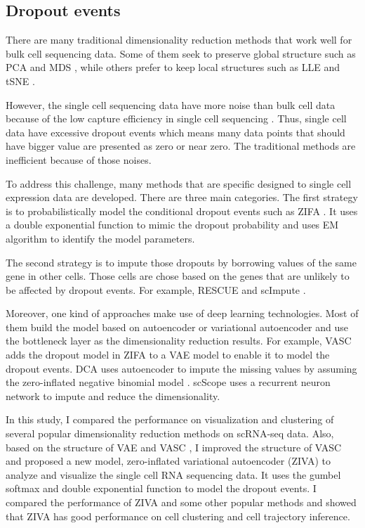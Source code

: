 \subsection{Dropout events}

There are many traditional dimensionality reduction methods that work well for bulk cell sequencing data. Some of them seek to preserve global structure such as PCA \cite{Abdi2010} and MDS \cite{Kruskal1964}, while others prefer to keep local structures such as LLE \cite{roweis2000nonlinear} and tSNE \cite{Kobak2019}.

However, the single cell sequencing data have more noise than bulk cell data because of the low capture efficiency in single cell sequencing \cite{Peng2019}. Thus, single cell data have excessive dropout events which means many data points that should have bigger value are presented as zero or near zero. The traditional methods are inefficient because of those noises.  

To address this challenge, many methods that are specific designed to single cell expression data are developed. There are three main categories. The first strategy is to probabilistically model the conditional dropout events such as ZIFA \cite{Pierson2015}. It uses a double exponential function to mimic the dropout probability and uses EM algorithm \cite{mclachlan2007algorithm} to identify the model parameters.

The second strategy is to impute those dropouts by borrowing values of the same gene in other cells. Those cells are chose based on the genes that are unlikely to be affected by dropout events. For example, RESCUE \cite{Tracy2019} and scImpute \cite{Li2018}. 

Moreover, one kind of approaches make use of deep learning technologies. Most of them build the model based on autoencoder or variational autoencoder and use the bottleneck layer as the dimensionality reduction results. For example, VASC \cite{Wang2018} adds the dropout model in ZIFA to a VAE model to enable it to model the dropout events. DCA \cite{Eraslan2019a} uses autoencoder to impute the missing values by assuming the zero-inflated negative binomial model \cite{Hafemeister2019}. scScope \cite{Deng2019} uses a recurrent neuron network to impute and reduce the dimensionality. 

In this study, I compared the performance on visualization and clustering of several popular dimensionality reduction methods on scRNA-seq data. Also, based on the structure of VAE \cite{Kingma2014} and VASC \cite{Wang2018}, I improved the structure of VASC and proposed a new model, zero-inflated variational autoencoder (ZIVA) to analyze and visualize the single cell RNA sequencing data. It uses the gumbel softmax and double exponential function to model the dropout events. I compared the performance of ZIVA and some other popular methods and showed that ZIVA has good performance on cell clustering and cell trajectory inference.

